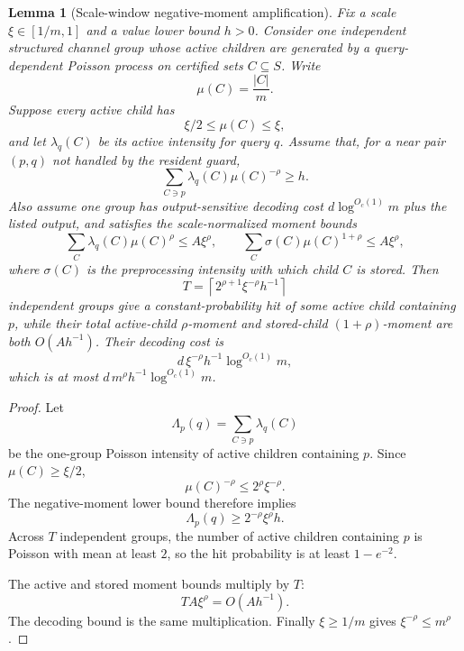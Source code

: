 \documentclass[10pt]{article}
\newtheorem{lemma}[theorem]{Lemma}
\theoremstyle{definition}
\begin{document}
\begin{lemma}[Scale-window negative-moment amplification]\label{lem:scale-window-compiler}
   Fix a scale $\xi\in[1/m,1]$ and a value lower bound $h>0$. Consider one independent structured channel group whose active children are generated by a query-dependent Poisson process on certified sets $C\subseteq S$. Write
   \[
      \mu(C)=\frac{|C|}{m}.
   \]
   Suppose every active child has
   \[
      \xi/2\le\mu(C)\le\xi,
   \]
   and let $\lambda_q(C)$ be its active intensity for query $q$. Assume that, for a near pair $(p,q)$ not handled by the resident guard,
   \[
      \sum_{C\ni p}\lambda_q(C)\mu(C)^{-\rho}\ge h.
   \]
   Also assume one group has output-sensitive decoding cost $d\log^{O_c(1)}m$ plus the listed output, and satisfies the scale-normalized moment bounds
   \[
      \sum_C\lambda_q(C)\mu(C)^\rho
      \le A\xi^\rho,
      \qquad
      \sum_C\sigma(C)\mu(C)^{1+\rho}
      \le A\xi^\rho,
   \]
   where $\sigma(C)$ is the preprocessing intensity with which child $C$ is stored. Then
   \[
      T=\left\lceil 2^{\rho+1}\xi^{-\rho}h^{-1}\right\rceil
   \]
   independent groups give a constant-probability hit of some active child containing $p$, while their total active-child $\rho$-moment and stored-child $(1+\rho)$-moment are both $O(Ah^{-1})$. Their decoding cost is
   \[
      d\,\xi^{-\rho}h^{-1}\log^{O_c(1)}m,
   \]
   which is at most $d\,m^\rho h^{-1}\log^{O_c(1)}m$.
\end{lemma}

\begin{proof}
   Let
   \[
      \Lambda_p(q)=\sum_{C\ni p}\lambda_q(C)
   \]
   be the one-group Poisson intensity of active children containing $p$. Since $\mu(C)\ge\xi/2$,
   \[
      \mu(C)^{-\rho}\le 2^\rho\xi^{-\rho}.
   \]
   The negative-moment lower bound therefore implies
   \[
      \Lambda_p(q)\ge 2^{-\rho}\xi^\rho h.
   \]
   Across $T$ independent groups, the number of active children containing $p$ is Poisson with mean at least $2$, so the hit probability is at least $1-e^{-2}$.

   The active and stored moment bounds multiply by $T$:
   \[
      T A\xi^\rho=O(Ah^{-1}).
   \]
   The decoding bound is the same multiplication. Finally $\xi\ge1/m$ gives $\xi^{-\rho}\le m^\rho$.
\end{proof}
\end{document}
